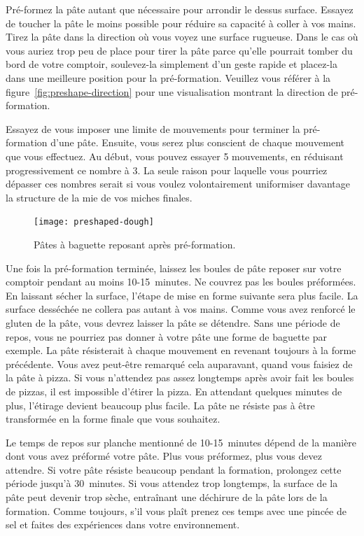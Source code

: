 Pré-formez la pâte autant que nécessaire pour arrondir le dessus
surface. Essayez de toucher la pâte le moins possible
pour réduire sa capacité à coller à vos mains. Tirez la pâte
dans la direction où vous voyez une surface rugueuse. Dans
le cas où vous auriez trop peu de place pour tirer la pâte parce qu'elle pourrait
tomber du bord de votre comptoir, soulevez-la simplement d'un geste rapide et placez-la
dans une meilleure position pour la pré-formation. Veuillez vous référer à la figure~\ref{fig:preshape-direction}
pour une visualisation montrant la direction de pré-formation.

Essayez de vous imposer une limite de mouvements pour terminer la pré-formation
d'une pâte. Ensuite, vous serez plus conscient de chaque mouvement
que vous effectuez. Au début, vous pouvez essayer 5 mouvements,
en réduisant progressivement ce nombre à 3. La seule raison pour laquelle vous pourriez dépasser ces
nombres serait si vous voulez volontairement uniformiser davantage la structure de la mie
de vos miches finales.

\begin{figure}[!htb]
  \texttt{[image: preshaped-dough]}
  \caption{Pâtes à baguette reposant après pré-formation.}%
  \label{fig:dough-after-preshaping}
\end{figure}

Une fois la pré-formation terminée, laissez les boules de pâte reposer
sur votre comptoir pendant au moins 10-15~minutes. Ne 
couvrez pas les boules préformées. En laissant sécher la surface,
l'étape de mise en forme suivante sera plus facile. La surface desséchée
ne collera pas autant à vos mains. Comme
vous avez renforcé le gluten de la pâte, vous devrez
laisser la pâte se détendre. Sans une période de repos, vous ne pourriez
pas donner à votre pâte une forme de baguette par exemple.
La pâte résisterait à chaque mouvement
en revenant toujours à la forme précédente. Vous
avez peut-être remarqué cela auparavant, quand vous faisiez de la pâte à pizza. Si vous
n'attendez pas assez longtemps après avoir fait les boules de pizzas, il est impossible
d'étirer la pizza. En attendant quelques minutes de plus,
l'étirage devient beaucoup plus facile. La pâte ne résiste pas
à être transformée en la forme finale que vous souhaitez.

Le temps de repos sur planche mentionné de 10-15~minutes dépend
de la manière dont vous avez préformé votre pâte. Plus
vous préformez, plus vous devez attendre. Si votre pâte
résiste beaucoup pendant la formation, prolongez cette période jusqu'à 30~minutes.
Si vous attendez trop longtemps, la surface de la pâte peut devenir trop sèche,
entraînant une déchirure de la pâte lors de la formation. Comme toujours, s'il vous plaît
prenez ces temps avec une pincée de sel et faites des expériences dans
votre environnement.

